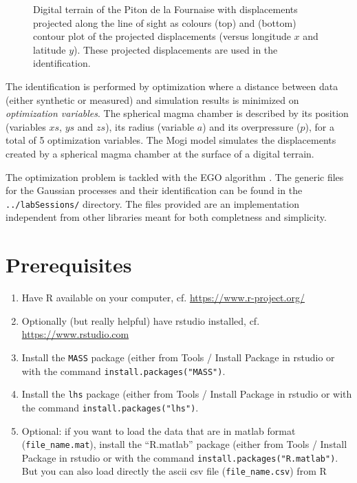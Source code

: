 \documentclass[12pt]{article}
\begin{document}
\begin{figure}
\begin{center}
\begin{minipage}{0.44\textwidth}
\end{minipage}
\end{center}
\caption{Digital terrain of the Piton de la Fournaise with displacements projected along the line of sight as colours (top) 
and (bottom) contour plot of the projected displacements (versus longitude $x$ and latitude $y$). 
These projected displacements are used in the identification.}
\label{fig-piton}
\end{figure}

The identification is performed by optimization where a distance between data (either synthetic or measured) 
and simulation results is minimized on \emph{optimization variables}. 
The spherical magma chamber is described by its position (variables $xs$, $ys$ and $zs$), its radius (variable $a$) and 
its overpressure ($p$), for a total of 5 optimization variables. The Mogi model \cite{Yamakawa1955,Mogi1958} simulates the displacements created 
by a spherical magma chamber at the surface of a digital terrain.

The optimization problem is tackled with the EGO algorithm \cite{Jones1998}. 
The generic files for the Gaussian processes and their identification can be found in the \texttt{../labSessions/} directory.
The files provided are an implementation independent from other libraries meant for both completness and simplicity.

\section{Prerequisites}
\begin{enumerate}
\item Have R available on your computer, cf. \url{https://www.r-project.org/}
\item Optionally (but really helpful) have rstudio installed, cf. \url{https://www.rstudio.com}
\item Install the \texttt{MASS} package (either from Tools / Install Package in rstudio or with the command \texttt{install.packages("MASS")}.
\item Install the \texttt{lhs} package (either from Tools / Install Package in rstudio or with the command \texttt{install.packages("lhs")}.
\item Optional: if you want to load the data that are in matlab format (\texttt{file\_name.mat}), 
install the ``R.matlab'' package (either from Tools / Install Package in rstudio or with the command \texttt{install.packages("R.matlab")}. But you can also load directly the ascii csv file (\texttt{file\_name.csv}) from R
\end{enumerate}
\end{document}
